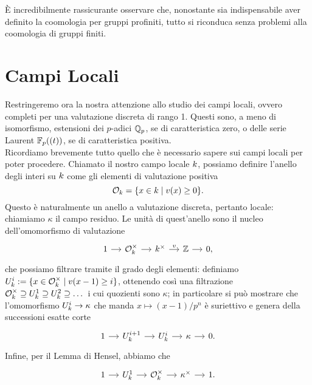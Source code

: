 \begin{profinite}
	È incredibilmente rassicurante osservare che, nonostante sia indispensabile aver definito la coomologia per gruppi profiniti, tutto si riconduca senza problemi alla coomologia di gruppi finiti.
\end{profinite}

\section{Campi Locali}
Restringeremo ora la nostra attenzione allo studio dei campi locali, ovvero completi per una valutazione discreta di rango 1. Questi sono, a meno di isomorfismo, estensioni dei $ p $-adici $ \mathbb{Q}_p $, se di caratteristica zero, o delle serie Laurent $ \mathbb{F}_p((t)) $, se di caratteristica positiva. \\

Ricordiamo brevemente tutto quello che è necessario sapere sui campi locali per poter procedere. Chiamato il nostro campo locale $ k $, possiamo definire l'anello degli interi su $ k $ come gli elementi di valutazione positiva
\[ \mathcal{O}_{k} = \{ x \in k \mid v(x)\geq 0 \}. \]
Questo è naturalmente un anello a valutazione discreta, pertanto locale: chiamiamo $ \kappa $ il campo residuo. Le unità di quest'anello sono il nucleo dell'omomorfismo di valutazione
\begin{equation}\label{local1}
	\begin{tikzcd}[column sep = small]
	1 \rar
	& \mathcal{O}_{\K}^\times \rar
	& \K^\times \rar["v"]
	& \Z \rar
	& 0,
	\end{tikzcd}
\end{equation}
che possiamo filtrare tramite il grado degli elementi: definiamo $ U_{k}^i :=\{x \in \mathcal{O}_{k}^\times \mid v(x-1) \geq i \} $, ottenendo così una filtrazione $ \mathcal{O}_{k}^\times \supseteq U_{k}^1 \supseteq U_{k}^2 \supseteq \dots $ 
i cui quozienti sono $ \kappa $; in particolare si può mostrare che l'omomorfismo $ U_{k}^i \to \kappa $ che manda $ x \mapsto (x-1)/p^n $ è suriettivo e genera della successioni esatte corte
\begin{equation}\label{local2}
\begin{tikzcd}[column sep = small]
1 \rar
& U_k^{i+1} \rar
& U_{\K}^i \rar
& \kappa \rar
& 0.
\end{tikzcd}
\end{equation}
Infine, per il Lemma di Hensel, abbiamo che
\begin{equation}\label{local3}
	\begin{tikzcd}[column sep = small]
	1 \rar
	& U_k^{1} \rar
	& \mathcal{O}_{\K}^\times \rar
	& \kappa^\times \rar
	&1.
	\end{tikzcd}
\end{equation}

